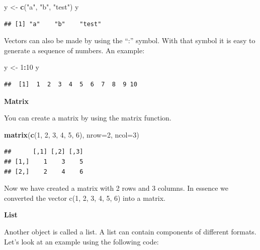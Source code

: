 \documentclass[
]{book}
\newenvironment{Shaded}{\begin{snugshade}}{\end{snugshade}}
\newcommand{\DataTypeTok}[1]{\textcolor[rgb]{0.13,0.29,0.53}{#1}}
\newcommand{\DecValTok}[1]{\textcolor[rgb]{0.00,0.00,0.81}{#1}}
\newcommand{\KeywordTok}[1]{\textcolor[rgb]{0.13,0.29,0.53}{\textbf{#1}}}
\newcommand{\NormalTok}[1]{#1}
\newcommand{\OperatorTok}[1]{\textcolor[rgb]{0.81,0.36,0.00}{\textbf{#1}}}
\newcommand{\StringTok}[1]{\textcolor[rgb]{0.31,0.60,0.02}{#1}}
\begin{document}
\begin{Shaded}
\begin{Highlighting}[]
\NormalTok{y <-}\StringTok{ }\KeywordTok{c}\NormalTok{(}\StringTok{"a"}\NormalTok{, }\StringTok{"b"}\NormalTok{, }\StringTok{"test"}\NormalTok{)}
\NormalTok{y}
\end{Highlighting}
\end{Shaded}

\begin{verbatim}
## [1] "a"    "b"    "test"
\end{verbatim}

Vectors can also be made by using the ``:'' symbol. With that symbol it is easy to generate a sequence of numbers. An example:

\begin{Shaded}
\begin{Highlighting}[]
\NormalTok{y <-}\StringTok{ }\DecValTok{1}\OperatorTok{:}\DecValTok{10}
\NormalTok{y}
\end{Highlighting}
\end{Shaded}

\begin{verbatim}
##  [1]  1  2  3  4  5  6  7  8  9 10
\end{verbatim}

\textbf{Matrix}

You can create a matrix by using the matrix function.

\begin{Shaded}
\begin{Highlighting}[]
\KeywordTok{matrix}\NormalTok{(}\KeywordTok{c}\NormalTok{(}\DecValTok{1}\NormalTok{, }\DecValTok{2}\NormalTok{, }\DecValTok{3}\NormalTok{, }\DecValTok{4}\NormalTok{, }\DecValTok{5}\NormalTok{, }\DecValTok{6}\NormalTok{), }\DataTypeTok{nrow=}\DecValTok{2}\NormalTok{, }\DataTypeTok{ncol=}\DecValTok{3}\NormalTok{)}
\end{Highlighting}
\end{Shaded}

\begin{verbatim}
##      [,1] [,2] [,3]
## [1,]    1    3    5
## [2,]    2    4    6
\end{verbatim}

Now we have created a matrix with 2 rows and 3 columns. In essence we converted the vector c(1, 2, 3, 4, 5, 6) into a matrix.

\textbf{List}

Another object is called a list. A list can contain components of different formats. Let's look at an example using the following code:
\end{document}

